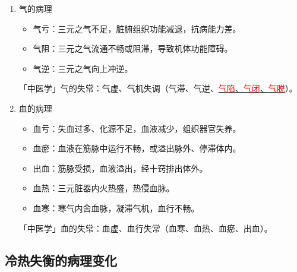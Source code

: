 \documentclass[cn,blue,12pt,normal,founder]{elegantnote}
\newcommand{\redt}[1]{\textcolor{red}{{}#1}}      %
\begin{document}
\begin{enumerate}
  \item 气的病理
  \begin{itemize}
    \item 气亏：三元之气不足，脏腑组织功能减退，抗病能力差。
    \item 气阻：三元之气流通不畅或阻滞，导致机体功能障碍。
    \item 气逆：三元之气向上冲逆。
  \end{itemize}

  \begin{note}
  「中医学」气的失常：气虚、气机失调（气滞、气逆、\uline{\redt{气陷}、\redt{气闭}、\redt{气脱}}）。
  \end{note}

  \item 血的病理
  \begin{itemize}
    \item 血亏：失血过多、化源不足，血液减少，组织器官失养。
    \item 血瘀：血液在筋脉中运行不畅，或溢出脉外、停滞体内。
    \item 出血：筋脉受损，血液溢出，经十窍排出体外。
    \item 血热：三元脏器内火热盛，热侵血脉。
    \item 血寒：寒气内舍血脉，凝滞气机，血行不畅。
  \end{itemize}

  \begin{note}
  「中医学」血的失常：血虚、血行失常（血寒、血热、血瘀、出血）。
  \end{note}
\end{enumerate}

\subsection{冷热失衡的病理变化}
\end{document}
